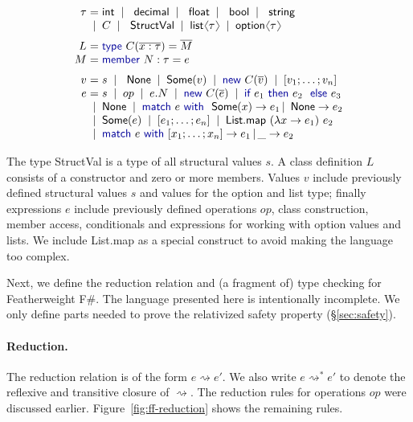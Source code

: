 \documentclass[10pt,preprint,clearpagebib]{sigplanconf}
\newcommand{\langl}{\begin{picture}(4.5,7)
\put(1.1,2.5){\rotatebox{60}{\line(1,0){5.5}}}
\put(1.1,2.5){\rotatebox{300}{\line(1,0){5.5}}}
\end{picture}}
\newcommand{\rangl}{\begin{picture}(4.5,7)
\put(.9,2.5){\rotatebox{120}{\line(1,0){5.5}}}
\put(.9,2.5){\rotatebox{240}{\line(1,0){5.5}}}
\end{picture}}
\newcommand{\kvd}[1]{\textnormal{\textcolor{kvdclr}{\sffamily #1}}}
\newcommand{\ident}[1]{\textnormal{\sffamily #1}}
\newcommand{\lsep}[0]{\;\; | \;\;}
\newcommand{\narrow}[1]{\hspace{-0.7em} #1 \hspace{-0.7em}}
\newcommand{\reduce}{\rightsquigarrow}
\begin{document}
\begin{equation*}
\begin{array}{rcl}
 \tau &\narrow{=}& \ident{int} \lsep \ident{decimal} \lsep \ident{float} \lsep \ident{bool} \lsep \ident{string} \\[0.0em]
      &\narrow{|}& C \lsep \ident{StructVal} \lsep \ident{list}\langl\tau\rangl \lsep \ident{option}\langl\tau\rangl \\[0.6em]
 L &\narrow{=}& \kvd{type}~C(\overline{x:\tau}) = \overline{M} \\[0.0em]
 M &\narrow{=}& \kvd{member}~N:\tau=e \\[0.6em]
 v &\narrow{=}& s \lsep \ident{None} \lsep \ident{Some}(v) \lsep \kvd{new}~C(\overline{v}) \lsep [v_1; \ldots; v_n] \\[0.0em]
 e &\narrow{=}& s \lsep op \lsep e.N \lsep \kvd{new}~C(\overline{e}) \lsep {\kvd{if}~e_1~\kvd{then}~e_2~\kvd{else}~e_3}\\
   &\narrow{|}& \ident{None} \lsep\kvd{match}~e~\kvd{with}~\ident{Some}(x) \rightarrow e_1 \,|\, \ident{None} \rightarrow e_2 \\
   &\narrow{|}& \ident{Some}(e) \lsep [e_1;\ldots;e_n]\lsep \ident{List.map}~(\lambda x\rightarrow e_1)~e_2\\
   &\narrow{|}& \kvd{match}~e~\kvd{with}~[x_1; \ldots; x_n] \rightarrow e_1 \,|\, \_ \rightarrow e_2
\end{array}
\end{equation*}

\noindent
The type \ident{StructVal} is a type of all structural values $s$. A class
definition $L$ consists of a constructor and zero or more members. Values $v$ include 
previously defined structural values $s$ and values for the option and list type; finally 
expressions $e$ include previously defined operations $op$, class construction, member access, 
conditionals and expressions for working with option values and lists. We include 
\ident{List.map} as a special construct to avoid making the language too complex.

Next, we define the reduction relation and (a fragment of) type checking for Featherweight F\#.
The language presented here is intentionally incomplete. We only define parts needed to prove
the relativized safety property (\S\ref{sec:safety}).

\paragraph{Reduction.}
The reduction relation is of the form $e \reduce e'$. We also write 
$e \reduce^{*} e'$ to denote the reflexive and transitive closure of $\reduce$. The reduction rules
for operations $op$ were discussed earlier. Figure~\ref{fig:ff-reduction} shows the remaining
rules.
\end{document}
